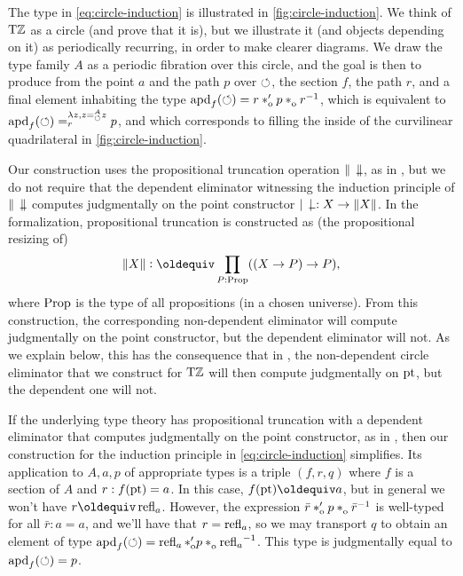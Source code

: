 \documentclass[a4paper,12pt]{amsart}
\begin{document}
The type in \cref{eq:circle-induction} is illustrated in \cref{fig:circle-induction}.
We think of ${\mathrm{T}\mathbb{Z}}$ as a circle (and prove that it is),
but we illustrate it (and objects depending on it) as periodically recurring,
in order to make clearer diagrams.
We draw the type family $A$ as a periodic fibration over this circle,
and the goal is then to produce from the point $a$ and the path $p$ over ${\circlearrowleft}$,
the section $f$, the path $r$, and a final element inhabiting
the type $\apd{f}(\Zloop) = r\ctop p \cto r^{-1}$, which is equivalent to
$\mathop{{\mathrm{apd}}_{f}}({\circlearrowleft}) =^{\lambda z, z=^A_{{\circlearrowleft}}z}_r p$,
and which corresponds to filling the inside of the curvilinear quadrilateral in \cref{fig:circle-induction}.

Our construction uses the propositional truncation operation $\Trunc{\blank}$,
as in \cite[6.9]{hottbook},
but we do not require that the dependent eliminator
witnessing the induction principle of $\Trunc{\blank}$
computes judgmentally on the point constructor $\trunc{\blank}: X \to \Trunc X$.
In the \UniMath{} formalization, propositional truncation is constructed as
(the propositional resizing of)
\begin{equation}\label{eq:trunc-impred}
  \Trunc X \defeq \prod_{P:\Prop}((X \to P) \to P),
\end{equation}
where $\mathord{\mathrm{Prop}}$ is the type of all propositions (in a chosen universe).
From this construction, the corresponding non-dependent eliminator
will compute judgmentally on the point constructor,
but the dependent eliminator will not.
As we explain below, this has the consequence that
in \UniMath{}, the non-dependent circle eliminator that we construct for ${\mathrm{T}\mathbb{Z}}$
will then compute judgmentally on ${\mathord{\mathrm{pt}}}$,
but the dependent one will not.

If the underlying type theory has propositional truncation with a dependent eliminator
that computes judgmentally on the point constructor, as in \cite[6.9]{hottbook},
then our construction for the induction principle in \cref{eq:circle-induction} simplifies.
Its application to $A,a,p$ of appropriate types
is a triple $(f,r,q)$ where $f$ is a section of $A$ and $r : f({\mathord{\mathrm{pt}}})= a$.
In this case, $f(\pt)\jdeq a$, but in general we won't have $r \jdeq \refl{a}$.
However, the expression $\bar r\ctop p \cto \bar r^{-1}$ is well-typed
for all $\bar r : a=a$, and we'll have that $r = \mathop{{\mathrm{refl}}_{a}}$,
so we may transport $q$ to obtain an element of type
$\apd{f}(\Zloop) = \refl{a} \ctop p \cto \refl{a}^{-1}$.
This type is judgmentally equal to $\mathop{{\mathrm{apd}}_{f}}({\circlearrowleft})=p$.
\end{document}
